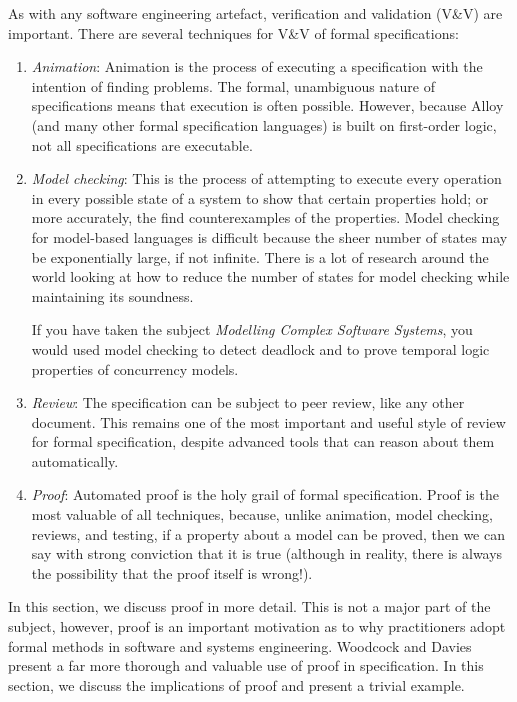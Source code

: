 As with any software engineering artefact, verification and validation (V\&V) are important. There are several techniques for V\&V of formal specifications:

\begin{enumerate}

 \item \emph{Animation}: Animation is the process of executing a specification with the intention of finding problems. The formal, unambiguous nature of specifications means that execution is often possible. However, because Alloy (and many other formal specification languages) is built on first-order logic, not all specifications are executable. 

 \item \emph{Model checking}: This is the process of attempting to execute every operation in every possible state of a system to show that certain properties hold; or more accurately, the find counterexamples of the properties. Model checking for model-based languages is difficult because the sheer number of states may be exponentially large, if not infinite. There is a lot of research around  the world looking at how to reduce the number of states for model checking while maintaining its soundness.

  If you have taken the subject \emph{Modelling Complex Software Systems}, you would used model checking to detect deadlock and to prove temporal logic properties of concurrency models.

 \item \emph{Review}: The specification can be subject to peer review, like any other document. This remains one of the most important and useful style of review for formal specification, despite advanced tools that can reason about them automatically.

 \item \emph{Proof}: Automated proof is the holy grail of formal specification. Proof is the most valuable of all techniques, because, unlike animation, model checking, reviews, and testing, if a property about a model can be proved, then we can say with strong conviction that it is true (although in reality, there is always the possibility that the proof itself is wrong!). 

\end{enumerate}

In this section, we discuss proof in more detail. This is not a major part of the subject, however, proof is an important motivation as to why practitioners adopt formal methods in software and systems engineering. Woodcock and Davies \cite{woodcock-using-z} present a far more thorough and valuable use of proof in specification. In this section, we discuss the implications of proof and present a trivial example.

